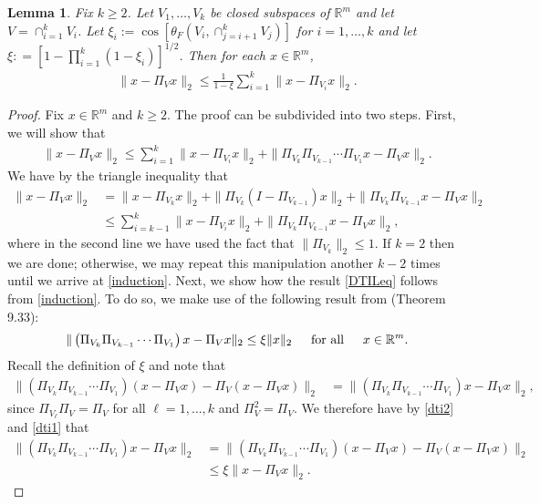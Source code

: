 \documentclass[journal, onecolumn]{IEEEtran}
\newtheorem{lemma}{Lemma}
\begin{document}

\begin{lemma}\label{DistanceToIntersectionLemma}
Fix $k \geq 2$. Let $V_1, \ldots, V_k$ be closed subspaces of $\mathbb{R}^m$ and let $V = \cap_{i=1}^k V_i$. Let $\xi_i := \cos\left[ \theta_F \left( V_i, \cap_{j=i+1}^k V_j \right) \right]$ for $i = 1, \ldots, k$ and let $\xi: = \left[ 1 - \prod_{i=1}^k(1 - \xi_i) \right]^{1/2}$. Then for each $x \in \mathbb{R}^m$,
\begin{align}\label{DTILeq}
\|x - \Pi_V x\|_2 \leq \frac{1}{1 - \xi} \sum_{i=1}^k \|x - \Pi_{V_i} x\|_2.
\end{align}
\end{lemma}

\begin{proof} 
Fix $x \in \mathbb{R}^m$ and $k \geq 2$. The proof can be subdivided into two steps. First, we will show that
\begin{align}\label{induction}
\|x - \Pi_Vx\|_2 \leq \sum_{i=1}^k \|x - \Pi_{V_i} x\|_2 + \|\Pi_{V_k}\Pi_{V_{k-1}}\cdots\Pi_{V_1} x - \Pi_V x\|_2.
\end{align}
%
We have by the triangle inequality that
\begin{align*}
\|x - \Pi_Vx\|_2 &= \|x - \Pi_{V_k} x\|_2 + \|\Pi_{V_k}(I - \Pi_{V_{k-1}}) x\|_2 + \|\Pi_{V_k}\Pi_{V_{k-1}}x - \Pi_Vx\|_2 \\
&\leq \sum_{i=k-1}^k\|x - \Pi_{V_i} x\|_2 + \|\Pi_{V_k}\Pi_{V_{k-1}} x - \Pi_V x\|_2,
\end{align*}
%
where in the second line we have used the fact that $\|\Pi_{V_k}\|_2 \leq 1$. If $k=2$ then we are done; otherwise, we may repeat this manipulation another $k-2$ times until we arrive at \eqref{induction}. Next, we show how the result \eqref{DTILeq} follows from \eqref{induction}. To do so, we make use of the following result from \cite{Deutsch} (Theorem 9.33):
\begin{align}\label{dti2}
\|\left(\Pi_{V_k}\Pi_{V_{k-1}}\cdots\Pi_{V_1}\right)x - \Pi_Vx\|_2 \leq \xi \|x\|_2 \indent \text{for all} \indent x \in \mathbb{R}^m.
\end{align}
%
Recall the definition of $\xi$ and note that
\begin{align}\label{dti1}
\|(\Pi_{V_k}\Pi_{V_{k-1}}\cdots\Pi_{V_1})(x - \Pi_Vx) - \Pi_V(x - \Pi_Vx)\|_2 
&= \|(\Pi_{V_k}\Pi_{V_{k-1}}\cdots\Pi_{V_1}) x - \Pi_V x \|_2,
\end{align}
%
since $\Pi_{V_\ell} \Pi_V = \Pi_V$ for all $\ell = 1, \ldots, k$ and $\Pi_V^2 = \Pi_V$.
%
We therefore have by \eqref{dti2} and \eqref{dti1} that
\begin{align*}
\|(\Pi_{V_k}\Pi_{V_{k-1}}\cdots\Pi_{V_1}) x - \Pi_V x \|_2
&= \|(\Pi_{V_k}\Pi_{V_{k-1}}\cdots\Pi_{V_1})(x - \Pi_Vx) - \Pi_V(x - \Pi_Vx)\|_2 \\
&\leq \xi \|x - \Pi_Vx\|_2.
\end{align*}


\end{proof}
\end{document}
